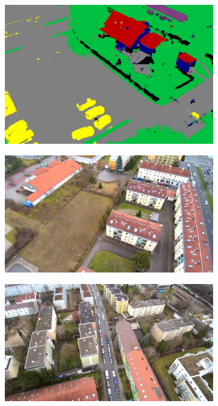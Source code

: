\documentclass[remotesensing,article,accept,moreauthors,pdftex,10pt,a4paper]{mdpi}
\theoremstyle{mdpi}
\newcounter{ex}
\newcounter{re}
\begin{document}
\begin{figure}[H]
\begin{subfigure}[tbp]{0.24\columnwidth}
           \includegraphics[width=\textwidth]{segment/kiga_seg2.png}
           \caption[]{}%
           {{\small }}    
           \label{fig:4h}
       \end{subfigure} 
       \begin{subfigure}[tbp]{0.275\columnwidth}
           \centering
           \includegraphics[width=\textwidth]{segment/mil_ori1.png}
           \caption[]{}
           {{\small }}
           \label{fig:4i}
       \end{subfigure}
       \begin{subfigure}[tbp]{0.275\columnwidth}
           \centering
           \includegraphics[width=\textwidth]{segment/mil_ori2.png}

\end{subfigure}
\end{figure}
\end{document}
